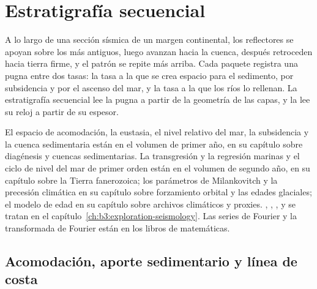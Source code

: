 \chapter{Estratigrafía secuencial}\label{ch:b3:sequence-stratigraphy}

A lo largo de una sección sísmica de un margen continental, los reflectores se apoyan sobre los más antiguos,
luego avanzan hacia la cuenca, después retroceden hacia tierra firme, y
el patrón se repite más arriba. Cada paquete registra una pugna entre
dos tasas: la tasa a la que se crea espacio para el sedimento, por subsidencia y por
el ascenso del mar, y la tasa a la que los ríos lo rellenan. La estratigrafía
secuencial lee la pugna a partir de la geometría de las capas, y
la  lee su reloj a partir de su espesor.

\begin{recall}
El espacio de acomodación, la eustasia, el nivel relativo del mar, la subsidencia y la
cuenca sedimentaria están en el volumen de primer año, en su capítulo sobre diagénesis y
cuencas sedimentarias. La transgresión y la regresión marinas y el ciclo de nivel del mar
de primer orden están en el volumen de segundo año, en su capítulo sobre la Tierra fanerozoica; los
parámetros de Milankovitch y la precesión climática en su capítulo sobre forzamiento orbital
y las edades glaciales; el modelo de edad en su capítulo sobre archivos climáticos
y proxies. , , ,  y  se tratan en el capítulo~\ref{ch:b3:exploration-seismology}. Las series de Fourier
y la transformada de Fourier están en los libros de matemáticas.
\end{recall}

\section{Acomodación, aporte sedimentario y línea de costa}\label{sec:b3:sequence-stratigraphy:shoreline}


